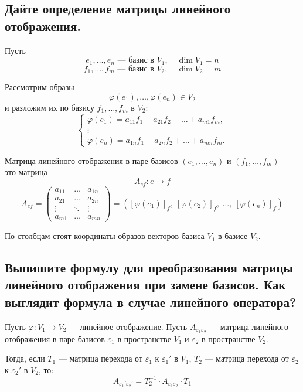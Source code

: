 \subsection{Дайте определение матрицы линейного отображения.}
\begin{definition}
Пусть
\[
    e_1, \ldots, e_n \text{ --- базис в } V_1,\quad \dim V_1 = n
\]
\[
    f_1, \ldots, f_m \text{ --- базис в } V_2,\quad \dim V_2 = m
\]

Рассмотрим образы
\[
    \varphi(e_1), \ldots, \varphi(e_n) \in V_2
\]
и разложим их по базису $f_1, \ldots, f_m$ в $V_2$:
\[
    \begin{cases}
        \varphi(e_1) = a_{11}f_1 + a_{21}f_2 + \ldots + a_{m1}f_m, \\
        \vdots \\
        \varphi(e_n) = a_{1n}f_1 + a_{2n}f_2 + \ldots + a_{mn}f_m.
    \end{cases}
\]


    Матрица линейного отображения в паре базисов
    $(e_1, \ldots, e_n)$ и $(f_1, \ldots, f_m)$ --- это матрица
    \[
        A_{ef}: e \to f
    \]
    \[
        A_{ef} =
        \begin{pmatrix}
            a_{11} & \ldots & a_{1n} \\
            a_{21} & \ldots & a_{2n} \\
            \vdots & \ddots & \vdots \\
            a_{m1} & \ldots & a_{mn}
        \end{pmatrix}
        =
        \left(
            [\varphi(e_1)]_f,\ [\varphi(e_2)]_f,\ \ldots,\ [\varphi(e_n)]_f
        \right)
    \]
\end{definition}

\begin{remark}
    По столбцам стоят координаты образов векторов базиса $V_1$ в базисе $V_2$.
\end{remark}

\subsection{Выпишите формулу для преобразования матрицы линейного отображения при замене базисов. Как выглядит формула в случае линейного оператора?}

\begin{theorem}
    Пусть $\varphi: V_1 \to V_2$ --- линейное отображение.
    Пусть $A_{\varepsilon_1 \varepsilon_2}$ --- матрица линейного отображения в паре базисов
    $\varepsilon_1$ в пространстве $V_1$ и $\varepsilon_2$ в пространстве $V_2$.
    
    Тогда, если $T_1$ --- матрица перехода от $\varepsilon_1$ к $\varepsilon_1'$ в $V_1$,
    $T_2$ --- матрица перехода от $\varepsilon_2$ к $\varepsilon_2'$ в $V_2$, то:
    \[
        A_{\varepsilon_1' \varepsilon_2'} = T_2^{-1} \cdot A_{\varepsilon_1 \varepsilon_2} \cdot T_1
    \]
\end{theorem}


